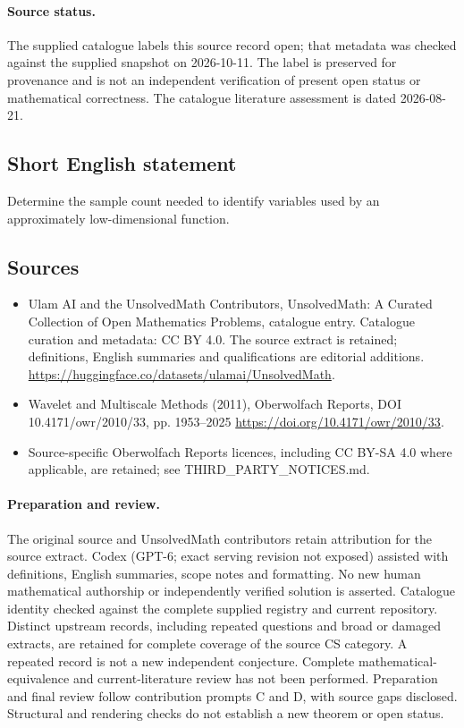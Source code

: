 \documentclass[11pt]{article}
\begin{document}
\paragraph{Source status.}
The supplied catalogue labels this source record open; that metadata was checked against the supplied snapshot on 2026-10-11. The label is preserved for provenance and is not an independent verification of present open status or mathematical correctness. The catalogue literature assessment is dated 2026-08-21.
\subsection{Short English statement}
Determine the sample count needed to identify variables used by an approximately low-dimensional function.
\subsection{Sources}
\begin{itemize}
\item[S1] Ulam AI and the UnsolvedMath Contributors, UnsolvedMath: A Curated Collection of Open Mathematics Problems, catalogue entry. Catalogue curation and metadata: CC BY 4.0. The source extract is retained; definitions, English summaries and qualifications are editorial additions.
\url{https://huggingface.co/datasets/ulamai/UnsolvedMath}.
\item[S2] Wavelet and Multiscale Methods (2011), Oberwolfach Reports, DOI 10.4171/owr/2010/33, pp. 1953--2025
\url{https://doi.org/10.4171/owr/2010/33}.
\item Source-specific Oberwolfach Reports licences, including CC BY-SA 4.0 where applicable, are retained; see THIRD\_PARTY\_NOTICES.md.
\end{itemize}
\paragraph{Preparation and review.}
The original source and UnsolvedMath contributors retain attribution for the source extract. Codex (GPT-6; exact serving revision not exposed) assisted with definitions, English summaries, scope notes and formatting. No new human mathematical authorship or independently verified solution is asserted. Catalogue identity checked against the complete supplied registry and current repository. Distinct upstream records, including repeated questions and broad or damaged extracts, are retained for complete coverage of the source CS category. A repeated record is not a new independent conjecture. Complete mathematical-equivalence and current-literature review has not been performed. Preparation and final review follow contribution prompts C and D, with source gaps disclosed. Structural and rendering checks do not establish a new theorem or open status.
\label{end:statement}
\end{document}
